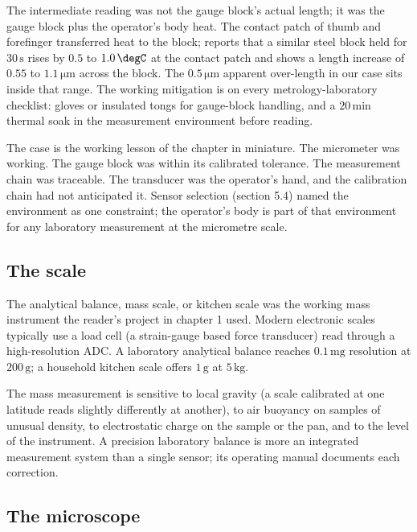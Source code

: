 The intermediate reading was not the gauge block's actual length;
it was the gauge block plus the operator's body heat. The contact
patch of thumb and forefinger transferred heat to the block;
\cite{paper:ch05t3-johnson-clarke-2003} reports that a similar
steel block held for $30 \,\si{\second}$ rises by $0.5$ to $1.0
\,\degC$ at the contact patch and shows a length increase of $0.55$
to $1.1 \,\si{\micro\meter}$ across the block. The $0.5 \,\si
{\micro\meter}$ apparent over-length in our case sits inside that
range. The working mitigation is on every metrology-laboratory
checklist: gloves or insulated tongs for gauge-block handling, and
a $20 \,\si{\minute}$ thermal soak in the measurement environment
before reading.

The case is the working lesson of the chapter in miniature. The
micrometer was working. The gauge block was within its calibrated
tolerance. The measurement chain was traceable. The transducer was
the operator's hand, and the calibration chain had not anticipated
it. Sensor selection (section 5.4) named the environment as one
constraint; the operator's body is part of that environment for any
laboratory measurement at the micrometre scale.

\subsection{The scale}

The analytical balance, mass scale, or kitchen scale was the
working mass instrument the reader's project in chapter 1 used.
Modern electronic scales typically use a load cell (a strain-gauge
based force transducer) read through a high-resolution ADC. A
laboratory analytical balance reaches $0.1 \,\si{\milli\gram}$
resolution at $200 \,\si{\gram}$; a household kitchen scale offers
$1 \,\si{\gram}$ at $5 \,\si{\kilogram}$.

The mass measurement is sensitive to local gravity (a scale
calibrated at one latitude reads slightly differently at another),
to air buoyancy on samples of unusual density, to electrostatic
charge on the sample or the pan, and to the level of the
instrument. A precision laboratory balance is more an integrated
measurement system than a single sensor; its operating manual
documents each correction.

\subsection{The microscope}


